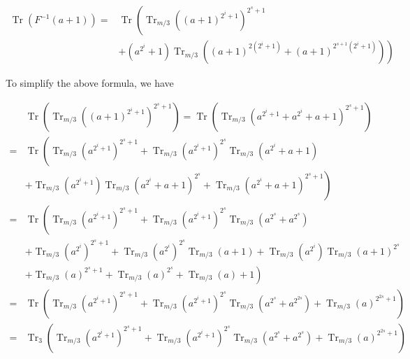 \documentclass[10pt]{article}
\begin{document}
$$
\begin{aligned}
\operatorname{Tr}\left(F^{-1}(a+1)\right)= & \operatorname{Tr}\left(\operatorname{Tr}_{m / 3}\left((a+1)^{2^{i}+1}\right)^{2^{s}+1}\right. \\
& \left.+\left(a^{2^{i}}+1\right) \operatorname{Tr}_{m / 3}\left((a+1)^{2\left(2^{i}+1\right)}+(a+1)^{2^{s+1}\left(2^{i}+1\right)}\right)\right)
\end{aligned}
$$

To simplify the above formula, we have

$$
\begin{aligned}
& \operatorname{Tr}\left(\operatorname{Tr}_{m / 3}\left((a+1)^{2^{i}+1}\right)^{2^{s}+1}\right)=\operatorname{Tr}\left(\operatorname{Tr}_{m / 3}\left(a^{2^{i}+1}+a^{2^{i}}+a+1\right)^{2^{s}+1}\right) \\
= & \operatorname{Tr}\left(\operatorname{Tr}_{m / 3}\left(a^{2^{i}+1}\right)^{2^{s}+1}+\operatorname{Tr}_{m / 3}\left(a^{2^{i}+1}\right)^{2^{s}} \operatorname{Tr}_{m / 3}\left(a^{2^{i}}+a+1\right)\right. \\
& \left.+\operatorname{Tr}_{m / 3}\left(a^{2^{i}+1}\right) \operatorname{Tr}_{m / 3}\left(a^{2^{i}}+a+1\right)^{2^{s}}+\operatorname{Tr}_{m / 3}\left(a^{2^{i}}+a+1\right)^{2^{s}+1}\right) \\
= & \operatorname{Tr}\left(\operatorname{Tr}_{m / 3}\left(a^{2^{i}+1}\right)^{2^{s}+1}+\operatorname{Tr}_{m / 3}\left(a^{2^{i}+1}\right)^{2^{s}} \operatorname{Tr}_{m / 3}\left(a^{2^{s}}+a^{2^{s}}\right)\right. \\
& +\operatorname{Tr}_{m / 3}\left(a^{2^{i}}\right)^{2^{s}+1}+\operatorname{Tr}_{m / 3}\left(a^{2^{i}}\right)^{2^{s}} \operatorname{Tr}_{m / 3}(a+1)+\operatorname{Tr}_{m / 3}\left(a^{2^{i}}\right) \operatorname{Tr}_{m / 3}(a+1)^{2^{s}} \\
& \left.+\operatorname{Tr}_{m / 3}(a)^{2^{s}+1}+\operatorname{Tr}_{m / 3}(a)^{2^{s}}+\operatorname{Tr}_{m / 3}(a)+1\right) \\
= & \operatorname{Tr}\left(\operatorname{Tr}_{m / 3}\left(a^{2^{i}+1}\right)^{2^{s}+1}+\operatorname{Tr}_{m / 3}\left(a^{2^{i}+1}\right)^{2^{s}} \operatorname{Tr}_{m / 3}\left(a^{2^{s}}+a^{2^{2 s}}\right)+\operatorname{Tr}_{m / 3}(a)^{2^{2 s}+1}\right) \\
= & \operatorname{Tr}_{3}\left(\operatorname{Tr}_{m / 3}\left(a^{2^{i}+1}\right)^{2^{s}+1}+\operatorname{Tr}_{m / 3}\left(a^{2^{i}+1}\right)^{2^{s}} \operatorname{Tr}_{m / 3}\left(a^{2^{s}}+a^{2^{s}}\right)+\operatorname{Tr}_{m / 3}(a)^{2^{2 s}+1}\right)
\end{aligned}
$$
\end{document}
